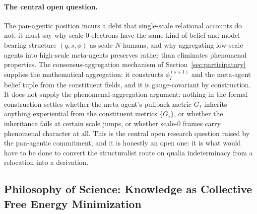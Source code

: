 \documentclass[11pt]{article}
\begin{document}
\paragraph{The central open question.}
The pan-agentic position incurs a debt that single-scale relational accounts do not: it must say why scale-0 electrons have the same kind of belief-and-model-bearing structure $(q, s, \phi)$ as scale-$N$ humans, and why aggregating low-scale agents into high-scale meta-agents preserves rather than eliminates phenomenal properties. The consensus-aggregation mechanism of Section~\ref{sec:participatory} supplies the mathematical aggregation: it constructs $\phi_I^{(s+1)}$ and the meta-agent belief tuple from the constituent fields, and it is gauge-covariant by construction. It does not supply the phenomenal-aggregation argument: nothing in the formal construction settles whether the meta-agent's pullback metric $G_I$ inherits anything experiential from the constituent metrics $\{G_i\}$, or whether the inheritance fails at certain scale jumps, or whether scale-0 frames carry phenomenal character at all. This is the central open research question raised by the pan-agentic commitment, and it is honestly an open one: it is what would have to be done to convert the structuralist route on qualia indeterminacy from a relocation into a derivation.

\subsection{Philosophy of Science: Knowledge as Collective Free Energy Minimization}
\label{sec:knowledge_collective_fem}
\end{document}
